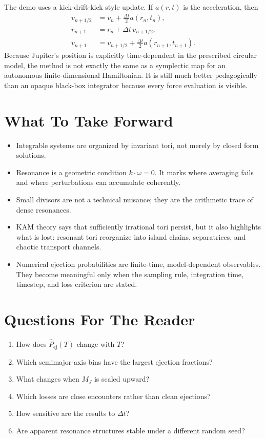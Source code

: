 The demo uses a kick-drift-kick style update. If \(a(r,t)\) is the acceleration,
then
\[
\begin{aligned}
  v_{n+1/2} &= v_n+\frac{\Delta t}{2}a(r_n,t_n),\\
  r_{n+1} &= r_n+\Delta t\,v_{n+1/2},\\
  v_{n+1} &= v_{n+1/2}+\frac{\Delta t}{2}a(r_{n+1},t_{n+1}).
\end{aligned}
\]
Because Jupiter's position is explicitly time-dependent in the prescribed
circular model, the method is not exactly the same as a symplectic map for an
autonomous finite-dimensional Hamiltonian. It is still much better pedagogically
than an opaque black-box integrator because every force evaluation is visible.

\section{What To Take Forward}
\label{sec:perturbation-chaos-take-forward}

\begin{itemize}
\item Integrable systems are organized by invariant tori, not merely by closed
form solutions.
\item Resonance is a geometric condition \(k\cdot\omega=0\). It marks where
averaging fails and where perturbations can accumulate coherently.
\item Small divisors are not a technical nuisance; they are the arithmetic
trace of dense resonances.
\item KAM theory says that sufficiently irrational tori persist, but it also
highlights what is lost: resonant tori reorganize into island chains,
separatrices, and chaotic transport channels.
\item Numerical ejection probabilities are finite-time, model-dependent
observables. They become meaningful only when the sampling rule, integration
time, timestep, and loss criterion are stated.
\end{itemize}

\section{Questions For The Reader}
\label{sec:asteroid-reader-questions}

\begin{enumerate}
\item How does \(\widehat P_{\mathrm{ej}}(T)\) change with \(T\)?
\item Which semimajor-axis bins have the largest ejection fractions?
\item What changes when \(M_J\) is scaled upward?
\item Which losses are close encounters rather than clean ejections?
\item How sensitive are the results to \(\Delta t\)?
\item Are apparent resonance structures stable under a different random seed?
\end{enumerate}

